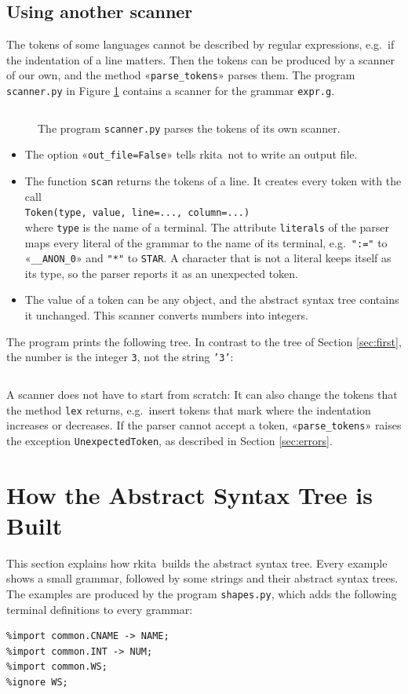 \documentclass[11pt,a4paper]{article}
\makeatletter
\newcommand{\fakesc}[1]{\resizebox{!}{0.99ex}{\textls[90]{\MakeUppercase{#1}}}}
\def\@simtextsc#1#2\@nil{\MakeUppercase{#1}\fakesc{#2}}
\newcommand{\simtextsc}[1]{%
  \ifmmode\text{\@simtextsc#1\@nil}\else\@simtextsc#1\@nil\fi}
\newcommand{\Larkita}{\simtextsc{Larkita}}
\newenvironment{unbreakable}{\par\noindent\begin{minipage}{\linewidth}}{\end{minipage}\par}
\newcommand{\codefigure}[5][]{\begin{figure}[H]%
  \inputminted[numbers = left, numbersep = 0.3cm, #1]{#2}{examples/#3}%
  \vspace*{-0.3cm}%
  \caption{#5}\label{#4}\end{figure}}
\newcommand{\pythonfile}[2]{\codefigure{python3}{#1}{fig:#1}{#2}}
\newcommand{\resultfile}[2][\normalsize]{\begin{unbreakable}%
  \inputminted[fontsize = #1, breaklines]{text}{examples/output/#2.txt}\end{unbreakable}}
\makeatother
\begin{document}
\subsection{Using another scanner}
\label{sec:other-scanner}
The tokens of some languages cannot be described by regular expressions, e.g.~if the indentation of a line
matters.  Then the tokens can be produced by a scanner of our own, and the method «\verb|parse_tokens|» parses
them.  The program \texttt{scanner.py} in Figure \ref{fig:scanner.py} contains a scanner for the grammar
\texttt{expr.g}.
\pythonfile{scanner.py}{The program \texttt{scanner.py} parses the tokens of its own scanner.}
\begin{itemize}
\item The option «\verb|out_file=False|» tells \Larkita\ not to write an output file.
\item The function \texttt{scan} returns the tokens of a line.  It creates every token with the call
      \\[0.2cm]
      \hspace*{1.3cm}
      \verb|Token(type, value, line=..., column=...)|
      \\[0.2cm]
      where \texttt{type} is the name of a terminal.  The attribute \texttt{literals} of the parser maps every literal of the grammar to the name of its terminal,
      e.g.~\verb|":="| to «\verb|__ANON_0|» and \verb|"*"| to \texttt{STAR}.  A character that is not a
      literal keeps itself as its type, so the parser reports it as an unexpected token.
\item The value of a token can be any object, and the abstract syntax tree contains it unchanged.  This
      scanner converts numbers into integers.
\end{itemize}
The program prints the following tree.  In contrast to the tree of Section \ref{sec:first}, the number is the
integer \texttt{3}, not the string \texttt{'3'}:
\resultfile{scanner}
A scanner does not have to start from scratch:  It can also change the tokens that the method \texttt{lex}
returns, e.g.~insert tokens that mark where the indentation increases or decreases.  If the parser cannot
accept a token, «\verb|parse_tokens|» raises the exception \texttt{UnexpectedToken}, as described in Section
\ref{sec:errors}.

\section{How the Abstract Syntax Tree is Built}
\label{sec:ast}
This section explains how \Larkita\ builds the abstract syntax tree.  Every example shows a small grammar,
followed by some strings and their abstract syntax trees.  The examples are produced by the program
\texttt{shapes.py}, which adds the following terminal definitions to every grammar:
\begin{unbreakable}
\begin{verbatim}
%import common.CNAME -> NAME;
%import common.INT -> NUM;
%import common.WS;
%ignore WS;
\end{verbatim}
\end{unbreakable}
\end{document}
